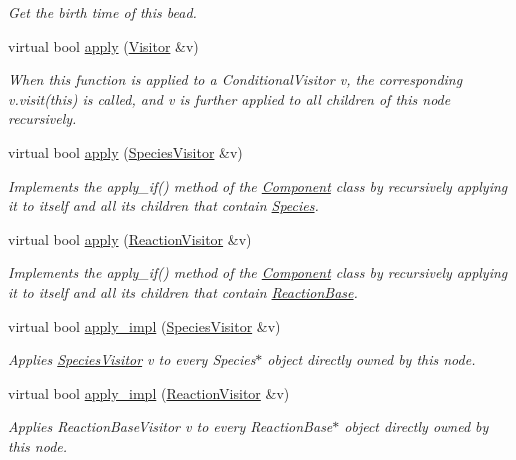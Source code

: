 \begin{DoxyCompactItemize}
\begin{DoxyCompactList}\small\item\em Get the birth time of this bead. \end{DoxyCompactList}\item 
virtual bool \hyperlink{classComponent_a06be9328d615af20a155e9060def1470}{apply} (\hyperlink{classVisitor}{Visitor} \&v)
\begin{DoxyCompactList}\small\item\em When this function is applied to a Conditional\+Visitor v, the corresponding v.\+visit(this) is called, and v is further applied to all children of this node recursively. \end{DoxyCompactList}\item 
virtual bool \hyperlink{classComponent_a0f1cd7534ba27c165a1574adc8d422dd}{apply} (\hyperlink{classSpeciesVisitor}{Species\+Visitor} \&v)
\begin{DoxyCompactList}\small\item\em Implements the apply\+\_\+if() method of the \hyperlink{classComponent}{Component} class by recursively applying it to itself and all its children that contain \hyperlink{classSpecies}{Species}. \end{DoxyCompactList}\item 
virtual bool \hyperlink{classComponent_aa911f6c2be71a33eeeb44f03c82cd421}{apply} (\hyperlink{classReactionVisitor}{Reaction\+Visitor} \&v)
\begin{DoxyCompactList}\small\item\em Implements the apply\+\_\+if() method of the \hyperlink{classComponent}{Component} class by recursively applying it to itself and all its children that contain \hyperlink{classReactionBase}{Reaction\+Base}. \end{DoxyCompactList}\item 
virtual bool \hyperlink{classComponent_a20f6f5a1f7da3238c069dfc35f174a4b}{apply\+\_\+impl} (\hyperlink{classSpeciesVisitor}{Species\+Visitor} \&v)
\begin{DoxyCompactList}\small\item\em Applies \hyperlink{classSpeciesVisitor}{Species\+Visitor} v to every Species$\ast$ object directly owned by this node. \end{DoxyCompactList}\item 
virtual bool \hyperlink{classComponent_ac9296f41e0b9c254d5adea9df3b4b07a}{apply\+\_\+impl} (\hyperlink{classReactionVisitor}{Reaction\+Visitor} \&v)
\begin{DoxyCompactList}\small\item\em Applies Reaction\+Base\+Visitor v to every Reaction\+Base$\ast$ object directly owned by this node. \end{DoxyCompactList}\item 

\end{DoxyCompactItemize}
